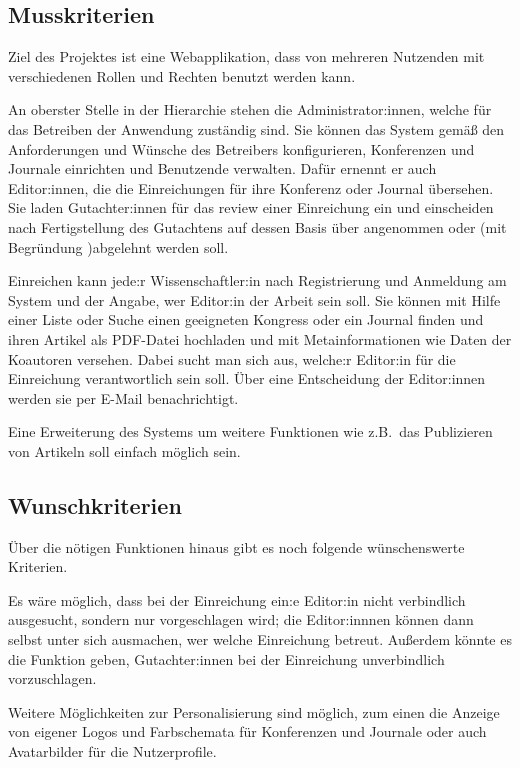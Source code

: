 
\subsection{Musskriterien}
Ziel des Projektes ist eine Webapplikation, dass von mehreren Nutzenden mit verschiedenen Rollen und Rechten benutzt werden kann.

An oberster Stelle in der Hierarchie stehen die Administrator:innen, welche für das Betreiben der Anwendung zuständig sind.
Sie können das System gemäß den Anforderungen und Wünsche des Betreibers konfigurieren, Konferenzen und Journale einrichten und Benutzende verwalten.
Dafür ernennt er auch Editor:innen, die die Einreichungen für ihre Konferenz oder Journal übersehen.
Sie laden Gutachter:innen für das review einer Einreichung ein und einscheiden nach Fertigstellung des Gutachtens auf dessen Basis über angenommen oder (mit Begründung )abgelehnt werden soll.

Einreichen kann jede:r Wissenschaftler:in nach Registrierung und Anmeldung am System und der Angabe, wer Editor:in der Arbeit sein soll.
Sie können mit Hilfe einer Liste oder Suche einen geeigneten Kongress oder ein Journal finden und ihren Artikel als PDF-Datei hochladen und mit Metainformationen wie Daten der Koautoren versehen.
Dabei sucht man sich aus, welche:r Editor:in für die Einreichung verantwortlich sein soll.
Über eine Entscheidung der Editor:innen werden sie per E-Mail benachrichtigt.

Eine Erweiterung des Systems um weitere Funktionen wie z.B.\ das Publizieren von Artikeln soll einfach möglich sein.

\subsection{Wunschkriterien}

Über die nötigen Funktionen hinaus gibt es noch folgende wünschenswerte Kriterien.

Es wäre möglich, dass bei der Einreichung ein:e Editor:in nicht verbindlich ausgesucht, sondern nur vorgeschlagen wird;
die Editor:innnen können dann selbst unter sich ausmachen, wer welche Einreichung betreut.
Außerdem könnte es die Funktion geben, Gutachter:innen bei der Einreichung unverbindlich vorzuschlagen.

Weitere Möglichkeiten zur Personalisierung sind möglich, zum einen die Anzeige von eigener Logos und Farbschemata für Konferenzen und Journale oder auch Avatarbilder für die Nutzerprofile.

